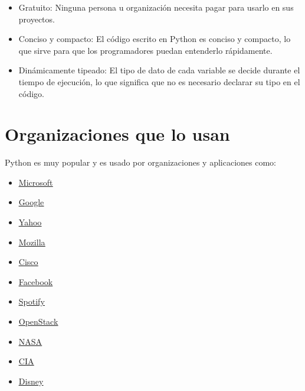 \documentclass{report}
\newcommand{\link}[2]{\href{#1}{\underline{#2}}}
\begin{document}
\begin{itemize}
  \item Gratuito: Ninguna persona u organización necesita pagar para usarlo en sus proyectos.
  
  \item Conciso y compacto: El código escrito en Python es conciso y compacto, lo que sirve para que los programadores puedan entenderlo rápidamente.
  
  \item Dinámicamente tipeado: El tipo de dato de cada variable se decide durante el tiempo de ejecución, lo que significa que no es necesario declarar su tipo en el código.
  
\end{itemize}

\section{Organizaciones que lo usan}

Python es muy popular y es usado por organizaciones y aplicaciones como:

\begin{itemize}
  \item \link{https://www.microsoft.com/en-us/}{Microsoft}

  \item \link{https://www.google.com}{Google}
  
  \item \link{https://www.yahoo.com}{Yahoo}
  
  \item \link{https://www.mozilla.org/en-US/}{Mozilla}
  
  \item \link{https://www.cisco.com}{Cisco}
  
  \item \link{https://www.facebook.com}{Facebook}
  
  \item \link{https://www.spotify.com}{Spotify}
  
  \item \link{https://www.openstack.org}{OpenStack}

  \item \link{https://www.nasa.gov}{NASA}
  
  \item \link{https://www.cia.gov}{CIA}
  
  \item \link{https://www.disney.com}{Disney}
  
\end{itemize}
\end{document}
